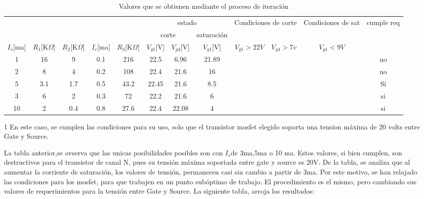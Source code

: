 \begin{table}[h]
\resizebox{\linewidth}{!}
{
 \begin{threeparttable}
	\begin{tabular}{|c|c|c|c|c|c|c|c|c|c|c|c|} 
		 \hline
		 \multicolumn{5}{|c|}{ \multirow{2}{20mm}{parámetros circuitales}} & 
		 \multicolumn{3}{c|}{estado} & 
		 \multicolumn{2}{c|}{\multirow{2}{20mm}{Condiciones de corte}} & 
		 \multirow{2}{20mm}{Condiciones de sat} 
		 & \multirow{3}{20mm}{cumple req} \\ \cline{6-8}
		 \multicolumn{5}{|c|}{} &  \multicolumn{2}{c|}{corte} & saturación & \multicolumn{2}{c|}{} && \\ \cline{1-11}
		 $I_s$[ma]&$R_1$[K$\Omega$]&$R_2$[K$\Omega$]&$I_c$[ma]&$R_3$[K$\Omega$] & $V_{g1}$[V]& $V_{g4}$[V]& $V_{g1}$[V] & $V_{g1}>22V$ & $V_{g4}>7v$ & $V_{g1}<9V$ & \\ \hline 
	1 & 16&9&0.1 &216&22.5 &6.96 &21.89 &\checkmark & \xmark  & \xmark & no \\ \hline
	2 & 8 & 4 & 0.2 & 108 & 22.4 & 21.6 & 16 & \checkmark & \checkmark & \xmark & no \\ \hline   	
	5 & 3.1 & 1.7 & 0.5 & 43.2 & 22.45 & 21.6 & 8.5 & \checkmark & \checkmark	& \checkmark &Sí\tnote{1} \\ \hline 
	3 & 6 & 2 & 0.3 & 72 & 22.2 & 21.6 & 6 & \checkmark & \checkmark & \checkmark & si\tnote{1}   \\ \hline
	10 & 2 & 0.4 & 0.8 & 27.6 & 22.4 & 22.08 & 4 & \checkmark & \checkmark & \checkmark & si \tnote{1} \\ \hline 
	\end{tabular}
	\begin{tablenotes}
		\small
		\item[1] En este caso, se cumplen las condiciones para su uso, solo que el transistor mosfet elegido soporta una tension máxima de 20 volts entre Gate y Source. 
	\end{tablenotes}
	\end{threeparttable}
}
\caption{Valores que se obtienen mediante el proceso de iteración}
\end{table}	

La tabla anterior,se ovserva que las unicas posibilidades posibles son con $I_s$de 3ma,5ma o 10 ma. Estos valores, si bien cumplen, son destructivos para el transistor de canal N, pues su tensión máxima soportada entre gate y source es 20V. De la tabla, se analiza que al aumentar la corriente de saturación, los valores de tensión, permanecen casi sin cambio a partir de 3ma. Por este motivo, se han relajado las condiciones para los mosfet, para que trabajen en un punto subóptimo de trabajo. El procedimiento es el mismo, pero cambiando sus valores de requerimientos para la tensión entre Gate y Source. La siguiente tabla, arroja los resultados: 



